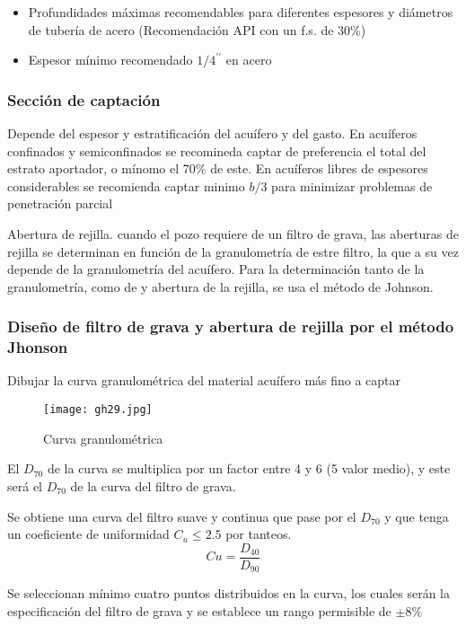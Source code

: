 \begin{itemize}
    \item Profundidades máximas recomendables para diferentes espesores y diámetros de tubería de acero (Recomendación API con un f.s. de 30\%)
    \item Espesor mínimo recomendado $1/4^{\prime\prime}$ en acero
\end{itemize}

\subsubsection{Sección de captación}
Depende del espesor y estratificación del acuífero  y del gasto. En acuíferos confinados y semiconfinados se recomineda captar de preferencia el total del estrato aportador, o mínomo el 70\% de este. En acuíferos libres de espesores considerables se recomienda captar minimo $b/3$ para minimizar problemas de penetración parcial

Abertura de rejilla. cuando el pozo requiere de un filtro de grava, las aberturas de rejilla se determinan en función de la granulometría de estre filtro, la que a su vez depende de la granulometría del acuífero. Para la determinación tanto de la granulometría, como de y abertura de la rejilla, se usa el método de Johnson.
\subsubsection{Diseño de filtro de grava y abertura de rejilla por el método Jhonson}

Dibujar la curva granulométrica del material acuífero más fino a captar
\begin{figure}[h!]
\centering
  \texttt{[image: gh29.jpg]}
  \caption{Curva granulométrica}
  \label{gh29}
\end{figure}

El $D_{70}$ de la curva se multiplica por un factor entre 4 y 6 (5 valor medio), y este será el $D_{70}$ de la curva del filtro de grava.

Se obtiene una curva del filtro suave y continua que pase por el $D_{70}$ y que tenga un coeficiente de uniformidad $C_u\leq 2.5$ por tanteos.
\begin{equation}
    Cu = \frac{D_{40}}{D_{90}}
\end{equation}

Se seleccionan mínimo cuatro puntos distribuidos en la curva, los cuales serán la especificación del filtro de grava y se establece un rango permisible de $\pm 8\%$

